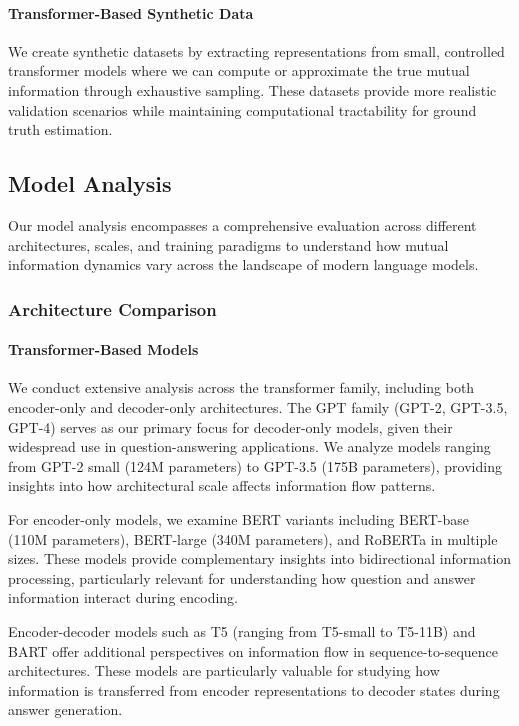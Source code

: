 \paragraph{Transformer-Based Synthetic Data}
We create synthetic datasets by extracting representations from small, controlled transformer models where we can compute or approximate the true mutual information through exhaustive sampling. These datasets provide more realistic validation scenarios while maintaining computational tractability for ground truth estimation.

\subsection{Model Analysis}
\label{subsec:model_analysis}

Our model analysis encompasses a comprehensive evaluation across different architectures, scales, and training paradigms to understand how mutual information dynamics vary across the landscape of modern language models.

\subsubsection{Architecture Comparison}

\paragraph{Transformer-Based Models}
We conduct extensive analysis across the transformer family, including both encoder-only and decoder-only architectures. The GPT family (GPT-2, GPT-3.5, GPT-4) serves as our primary focus for decoder-only models, given their widespread use in question-answering applications. We analyze models ranging from GPT-2 small (124M parameters) to GPT-3.5 (175B parameters), providing insights into how architectural scale affects information flow patterns.

For encoder-only models, we examine BERT variants including BERT-base (110M parameters), BERT-large (340M parameters), and RoBERTa in multiple sizes. These models provide complementary insights into bidirectional information processing, particularly relevant for understanding how question and answer information interact during encoding.

Encoder-decoder models such as T5 (ranging from T5-small to T5-11B) and BART offer additional perspectives on information flow in sequence-to-sequence architectures. These models are particularly valuable for studying how information is transferred from encoder representations to decoder states during answer generation.

